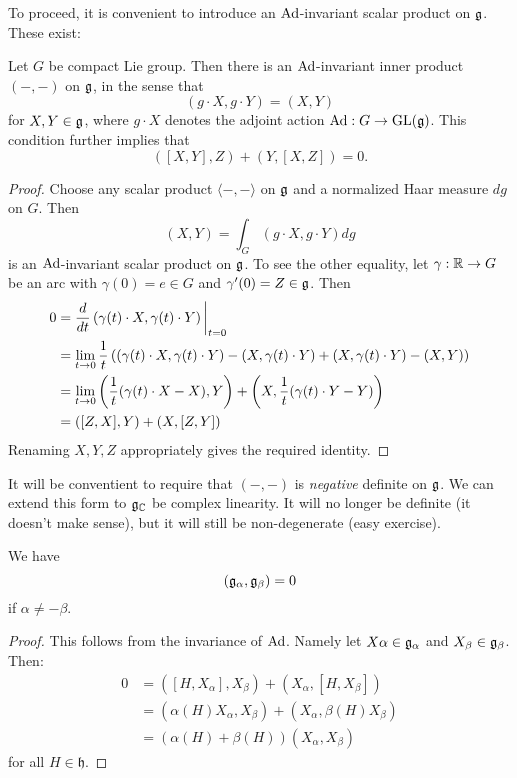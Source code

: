 \documentclass[11pt, english]{article}
\begin{document}
To proceed, it is convenient to introduce an $\operatorname{Ad}$-invariant scalar product on $\mathfrak g$. These exist:

\begin{lemma}
Let $G$ be compact Lie group. Then there is an $\operatorname{Ad}$-invariant inner product $( -,-)$ on $\mathfrak g$, in the sense that $$( g \cdot X, g\cdot Y )  = (X , Y )$$
for $X,Y \in \mathfrak g$, where $g \cdot X$ denotes the adjoint action $\operatorname{Ad}:G \to \operatorname{GL}(\mathfrak g)$. This condition further implies that
$$
( [X,Y],Z )  +(Y,[X,Z]) = 0.
$$
\end{lemma}
\begin{proof}
 Choose any scalar product $\langle -,-\rangle $ on $\mathfrak g$ and a normalized Haar measure $dg$ on $G$. Then 
$$
(X,Y ) = \int_G (g \cdot X, g\cdot Y) dg
$$
is an $\operatorname{Ad}$-invariant scalar product on $\mathfrak g$. To see the other equality, let $\gamma:\mathbb{R} \to G$ be an arc with $\gamma(0)=e \in G$ and $\gamma'(0)=Z \in \mathfrak g$. Then
\begin{align*}
0 &=   \restr{\frac{d}{dt}\left( \gamma(t) \cdot X, \gamma(t) \cdot Y \right)}{t = 0} \\
 &= \lim_{t \to 0} \frac 1t \left(( \gamma(t) \cdot X, \gamma(t) \cdot Y ) - ( X, \gamma(t) \cdot  Y ) + ( X, \gamma(t) \cdot Y ) - ( X, Y ) \right) \\
&= \lim_{t \to 0} \left( \frac 1t (\gamma(t) \cdot X - X), Y \right) + \left( X, \frac 1t (\gamma(t) \cdot Y - Y) \right) \\
&= ( [Z,X],Y ) + ( X, [Z,Y])
\end{align*}
Renaming $X,Y,Z$ appropriately gives the required identity.
\end{proof}

It will be conventient to require that $( -,- )$ is \emph{negative} definite on $\mathfrak g$. We can extend this form to $\mathfrak g_{\mathbb{C}}$ be complex linearity. It will no longer be definite (it doesn't make sense), but it will still be non-degenerate (easy exercise). 

\begin{lemma}
We have
$$
(\mathfrak g_\alpha, \mathfrak g_\beta ) = 0
$$
if $\alpha \neq -\beta$.
\end{lemma}
\begin{proof}
This follows from the invariance of $\operatorname{Ad}$. Namely let $X \alpha \in \mathfrak g_\alpha$ and $X_\beta \in \mathfrak g_\beta$. Then:
\begin{align*}
  0 &= ([H,X_\alpha],X_\beta ) + (X_\alpha,[H,X_\beta]) \\
&= (\alpha(H)X_\alpha, X_\beta) + (X_\alpha,\beta(H)X_\beta) \\
&= (\alpha(H)+\beta(H)) (X_\alpha,X_\beta)
\end{align*}
for all $H \in \mathfrak h$.
\end{proof}
\end{document}
